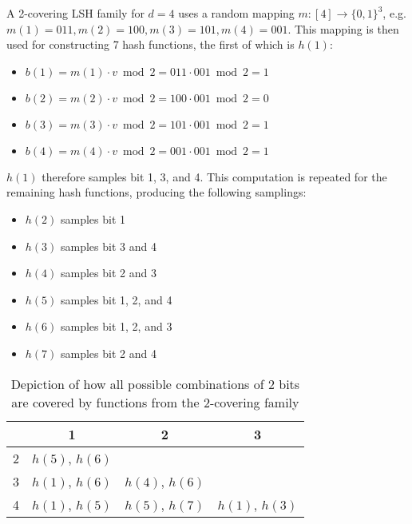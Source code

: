 \begin{example}
\label{example-covering-family}
  A 2-covering LSH family for $d = 4$ uses a random mapping $m \colon [4] \rightarrow \{0, 1\}^3$, e.g. $m(1) = 011, m(2) = 100, m(3) = 101, m(4) = 001$. This mapping is then used for constructing 7 hash functions, the first of which is $h(1)$:

  \begin{itemize}
    \item[] $b(1) = m(1) \cdot v \bmod 2 = 011 \cdot 001 \bmod 2 = 1$
    \item[] $b(2) = m(2) \cdot v \bmod 2 = 100 \cdot 001 \bmod 2 = 0$
    \item[] $b(3) = m(3) \cdot v \bmod 2 = 101 \cdot 001 \bmod 2 = 1$
    \item[] $b(4) = m(4) \cdot v \bmod 2 = 001 \cdot 001 \bmod 2 = 1$
  \end{itemize}

  $h(1)$ therefore samples bit 1, 3, and 4. This computation is repeated for the remaining hash functions, producing the following samplings:

  \begin{itemize}
    \item $h(2)$ samples bit 1
    \item $h(3)$ samples bit 3 and 4
    \item $h(4)$ samples bit 2 and 3
    \item $h(5)$ samples bit 1, 2, and 4
    \item $h(6)$ samples bit 1, 2, and 3
    \item $h(7)$ samples bit 2 and 4
  \end{itemize}
\end{example}

\begin{table}[h]
  \centering
  \begin{tabular}{c | c | c | c}
    & 1 & 2 & 3 \\
    \hline
    2 & $h(5)$, $h(6)$ & \cellcolor{gray!10} & \cellcolor{gray!10} \\
    \hline
    3 & $h(1)$, $h(6)$ & $h(4)$, $h(6)$ & \cellcolor{gray!10} \\
    \hline
    4 & $h(1)$, $h(5)$ & $h(5)$, $h(7)$ & $h(1)$, $h(3)$ \\
  \end{tabular}

  \caption{Depiction of how all possible combinations of 2 bits are covered by functions from the 2-covering family}
  \label{table-covering-family}
\end{table}

